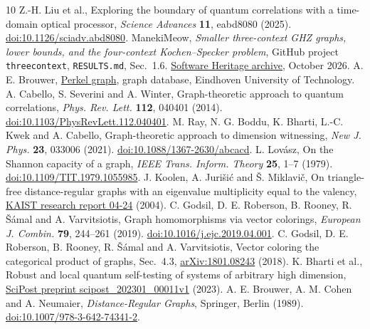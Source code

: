 \documentclass[11pt]{article}
\begin{document}
\begin{thebibliography}{10}
 Z.-H. Liu et al., Exploring the boundary of quantum correlations with a time-domain optical processor, \emph{Science Advances} \textbf{11}, eabd8080 (2025). \href{https://doi.org/10.1126/sciadv.abd8080}{doi:10.1126/sciadv.abd8080}.
 ManekiMeow, \emph{Smaller three-context GHZ graphs, lower bounds, and the four-context Kochen--Specker problem}, GitHub project \texttt{threecontext}, \texttt{RESULTS.md}, Sec.~1.6. \href{https://archive.softwareheritage.org/browse/content/sha1_git:601b64d894427aee82f13277f681cd6753768448/}{Software Heritage archive}, October 2026.
 A. E. Brouwer, \href{https://aeb.win.tue.nl/graphs/Perkel.html}{Perkel graph}, graph database, Eindhoven University of Technology.
 A. Cabello, S. Severini and A. Winter, Graph-theoretic approach to quantum correlations, \emph{Phys. Rev. Lett.} \textbf{112}, 040401 (2014). \href{https://doi.org/10.1103/PhysRevLett.112.040401}{doi:10.1103/PhysRevLett.112.040401}.
 M. Ray, N. G. Boddu, K. Bharti, L.-C. Kwek and A. Cabello, Graph-theoretic approach to dimension witnessing, \emph{New J. Phys.} \textbf{23}, 033006 (2021). \href{https://doi.org/10.1088/1367-2630/abcacd}{doi:10.1088/1367-2630/abcacd}.
 L. Lov\'asz, On the Shannon capacity of a graph, \emph{IEEE Trans. Inform. Theory} \textbf{25}, 1--7 (1979). \href{https://doi.org/10.1109/TIT.1979.1055985}{doi:10.1109/TIT.1979.1055985}.
 J. Koolen, A. Juri\v{s}i\'c and \v{S}. Miklavi\v{c}, On triangle-free distance-regular graphs with an eigenvalue multiplicity equal to the valency, \href{https://mathsci.kaist.ac.kr/bk21/morgue/research_report_pdf/04-24.pdf}{KAIST research report 04-24} (2004).
 C. Godsil, D. E. Roberson, B. Rooney, R. \v S\'amal and A. Varvitsiotis, Graph homomorphisms via vector colorings, \emph{European J. Combin.} \textbf{79}, 244--261 (2019). \href{https://doi.org/10.1016/j.ejc.2019.04.001}{doi:10.1016/j.ejc.2019.04.001}.
 C. Godsil, D. E. Roberson, B. Rooney, R. \v S\'amal and A. Varvitsiotis, Vector coloring the categorical product of graphs, Sec.~4.3, \href{https://arxiv.org/abs/1801.08243}{arXiv:1801.08243} (2018).
 K. Bharti et al., Robust and local quantum self-testing of systems of arbitrary high dimension, \href{https://scipost.org/preprints/scipost_202301_00011v1/}{SciPost preprint scipost\_202301\_00011v1} (2023).
 A. E. Brouwer, A. M. Cohen and A. Neumaier, \emph{Distance-Regular Graphs}, Springer, Berlin (1989). \href{https://doi.org/10.1007/978-3-642-74341-2}{doi:10.1007/978-3-642-74341-2}.
\end{thebibliography}
\end{document}
